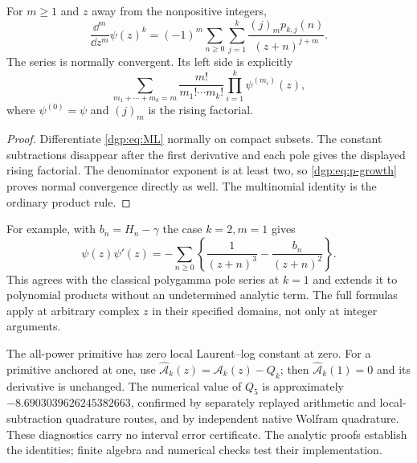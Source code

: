 \begin{corollary}
\label{dgp:cor:derivatives}
For $m\ge1$ and $z$ away from the nonpositive integers,
\begin{equation}
 \frac{\dd^m}{\dd z^m}\psi(z)^k
  =(-1)^m\sum_{n\ge0}\sum_{j=1}^k
              \frac{(j)_m p_{k,j}(n)}{(z+n)^{j+m}}.
 \label{dgp:eq:all-derivatives}
\end{equation}
The series is normally convergent.  Its left side is explicitly
\begin{equation}
 \sum_{m_1+\cdots+m_k=m}
          \frac{m!}{m_1!\cdots m_k!}
                         \prod_{i=1}^k\psi^{(m_i)}(z),
 \label{dgp:eq:polygamma-multinomial}
\end{equation}
where $\psi^{(0)}=\psi$ and $(j)_m$ is the rising factorial.
\end{corollary}

\begin{proof}
Differentiate \eqref{dgp:eq:ML} normally on compact subsets.  The constant
subtractions disappear after the first derivative and each pole gives
the displayed rising factorial.  The denominator exponent is at least
two, so \eqref{dgp:eq:p-growth} proves normal convergence directly as well.
The multinomial identity is the ordinary product rule.
\end{proof}

For example, with $b_n=H_n-\gamma$ the case $k=2,m=1$ gives
\[
 \psi(z)\psi'(z)
     =-\sum_{n\ge0}\left\{\frac1{(z+n)^3}
                             -\frac{b_n}{(z+n)^2}\right\}.
\]
This agrees with the classical polygamma pole series at $k=1$ and
extends it to polynomial products without an undetermined analytic
term.  The full formulas apply at arbitrary complex $z$ in their
specified domains, not only at integer arguments.


The all-power primitive has zero local Laurent--log constant at zero.
For a primitive anchored at one, use $\widehat{\mathcal A}_k(z)=\mathcal A_k(z)-Q_k$;
then $\widehat{\mathcal A}_k(1)=0$ and its derivative is unchanged.
The numerical value of $Q_5$ is approximately $-8.6903039626245382663$,
confirmed by separately replayed arithmetic and local-subtraction quadrature
routes, and by independent native Wolfram quadrature. These diagnostics
carry no interval error certificate. The analytic proofs establish the
identities; finite algebra and numerical checks test their implementation.
